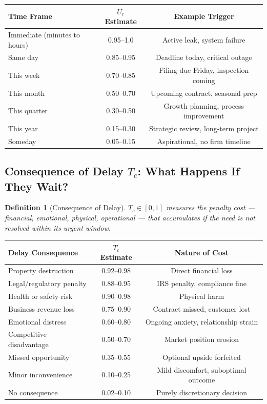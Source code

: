 \documentclass[12pt, openany]{book}
\theoremstyle{thmstyle}
\theoremstyle{defstyle}
\newtheorem{definition}{Definition}[chapter]
\begin{document}
\begin{center}
\begin{tabular}{lcc}
\toprule
\textbf{Time Frame} & \textbf{$U_r$ Estimate} & \textbf{Example Trigger} \\
\midrule
Immediate (minutes to hours) & 0.95--1.0 & Active leak, system failure \\
Same day & 0.85--0.95 & Deadline today, critical outage \\
This week & 0.70--0.85 & Filing due Friday, inspection coming \\
This month & 0.50--0.70 & Upcoming contract, seasonal prep \\
This quarter & 0.30--0.50 & Growth planning, process improvement \\
This year & 0.15--0.30 & Strategic review, long-term project \\
Someday & 0.05--0.15 & Aspirational, no firm timeline \\
\bottomrule
\end{tabular}
\end{center}

\subsection{Consequence of Delay $T_c$: What Happens If They Wait?}

\begin{definition}[Consequence of Delay]
$T_c \in [0, 1]$ measures the penalty cost --- financial, emotional, physical, operational --- that accumulates if the need is not resolved within its urgent window.
\end{definition}

\begin{center}
\begin{tabular}{lcc}
\toprule
\textbf{Delay Consequence} & \textbf{$T_c$ Estimate} & \textbf{Nature of Cost} \\
\midrule
Property destruction & 0.92--0.98 & Direct financial loss \\
Legal/regulatory penalty & 0.88--0.95 & IRS penalty, compliance fine \\
Health or safety risk & 0.90--0.98 & Physical harm \\
Business revenue loss & 0.75--0.90 & Contract missed, customer lost \\
Emotional distress & 0.60--0.80 & Ongoing anxiety, relationship strain \\
Competitive disadvantage & 0.50--0.70 & Market position erosion \\
Missed opportunity & 0.35--0.55 & Optional upside forfeited \\
Minor inconvenience & 0.10--0.25 & Mild discomfort, suboptimal outcome \\
No consequence & 0.02--0.10 & Purely discretionary decision \\
\bottomrule
\end{tabular}
\end{center}
\end{document}
